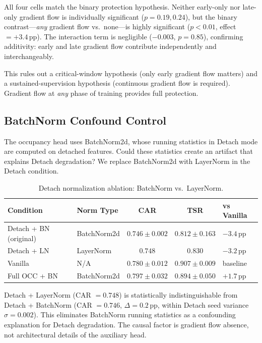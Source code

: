 \documentclass[letterpaper]{article}
\begin{document}
All four cells match the binary protection hypothesis. Neither early-only nor late-only gradient flow is individually significant ($p = 0.19, 0.24$), but the binary contrast---\emph{any} gradient flow vs.\ none---is highly significant ($p < 0.01$, effect $= +3.4$\,pp). The interaction term is negligible ($-0.003$, $p = 0.85$), confirming additivity: early and late gradient flow contribute independently and interchangeably.

This rules out a critical-window hypothesis (only early gradient flow matters) and a sustained-supervision hypothesis (continuous gradient flow is required). Gradient flow at \emph{any} phase of training provides full protection.

\subsection{BatchNorm Confound Control}
\label{sec:exp-batchnorm}

The occupancy head uses BatchNorm2d, whose running statistics in Detach mode are computed on detached features. Could these statistics create an artifact that explains Detach degradation? We replace BatchNorm2d with LayerNorm in the Detach condition.

\begin{table}[h]
\centering
\caption{Detach normalization ablation: BatchNorm vs.\ LayerNorm.}
\label{tab:bn}
\begin{tabular}{llccl}
\toprule
Condition & Norm Type & CAR & TSR & vs Vanilla \\
\midrule
Detach + BN (original) & BatchNorm2d & $0.746 \pm 0.002$ & $0.812 \pm 0.163$ & $-3.4$\,pp \\
Detach + LN            & LayerNorm   & $0.748$           & $0.830$           & $-3.2$\,pp \\
Vanilla                & N/A         & $0.780 \pm 0.012$ & $0.907 \pm 0.009$ & baseline \\
Full OCC + BN          & BatchNorm2d & $0.797 \pm 0.032$ & $0.894 \pm 0.050$ & $+1.7$\,pp \\
\bottomrule
\end{tabular}
\end{table}

Detach + LayerNorm (CAR $= 0.748$) is statistically indistinguishable from Detach + BatchNorm (CAR $= 0.746$, $\Delta = 0.2$\,pp, within Detach seed variance $\sigma = 0.002$). This eliminates BatchNorm running statistics as a confounding explanation for Detach degradation. The causal factor is gradient flow absence, not architectural details of the auxiliary head.
\end{document}
